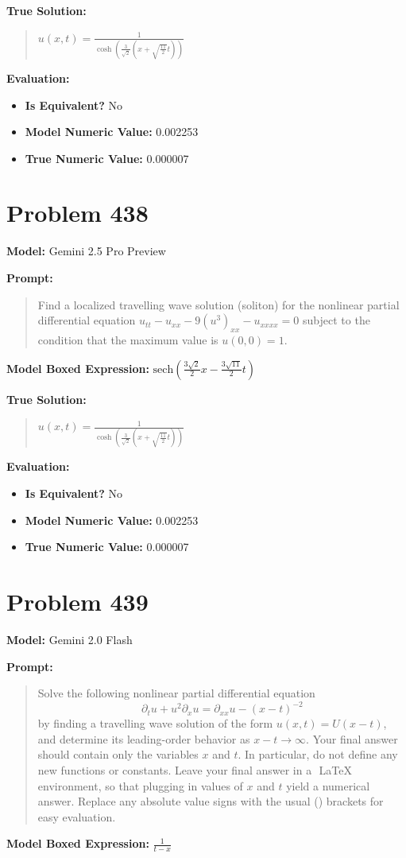 \documentclass{article}
\begin{document}
\textbf{True Solution:}
\begin{quote}
$u(x,t)=\frac{1}{\cosh(\frac{3}{\sqrt{2}}(x+\sqrt{\frac{11}{2}}t))}$
\end{quote}

\textbf{Evaluation:}
\begin{itemize}
\item \textbf{Is Equivalent?} No
\item \textbf{Model Numeric Value:} 0.002253
\item \textbf{True Numeric Value:} 0.000007
\end{itemize}
\vspace{1cm}
\section*{Problem 438}
\textbf{Model:} Gemini 2.5 Pro Preview

\textbf{Prompt:}
\begin{quote}
Find a localized travelling wave solution (soliton) for the nonlinear partial differential equation $u_{tt} - u_{xx} - 9(u^3)_{xx} - u_{xxxx}=0$ subject to the condition that the maximum value is $u(0,0) = 1$.
\end{quote}
\textbf{Model Boxed Expression:} $\text{sech}\left(\frac{3\sqrt{2}}{2}x - \frac{3\sqrt{11}}{2}t\right)$

\textbf{True Solution:}
\begin{quote}
$u(x,t)=\frac{1}{\cosh(\frac{3}{\sqrt{2}}(x+\sqrt{\frac{11}{2}}t))}$
\end{quote}

\textbf{Evaluation:}
\begin{itemize}
\item \textbf{Is Equivalent?} No
\item \textbf{Model Numeric Value:} 0.002253
\item \textbf{True Numeric Value:} 0.000007
\end{itemize}
\vspace{1cm}
\section*{Problem 439}
\textbf{Model:} Gemini 2.0 Flash

\textbf{Prompt:}
\begin{quote}
Solve the following nonlinear partial differential equation $$ \partial_t u + u^2 \partial_x u = \partial_{xx}u - (x-t)^{-2} $$ by finding a travelling wave solution of the form $u(x,t) = U(x-t)$, and determine its leading-order behavior as $x-t \to \infty$. Your final answer should contain only the variables $x$ and $t$. In particular, do not define any new functions or constants. Leave your final answer in a $\boxed{}$ LaTeX environment, so that plugging in values of $x$ and $t$ yield a numerical answer. Replace any absolute value signs with the usual () brackets for easy evaluation.
\end{quote}
\textbf{Model Boxed Expression:} $\frac{1}{t-x}$
\end{document}
